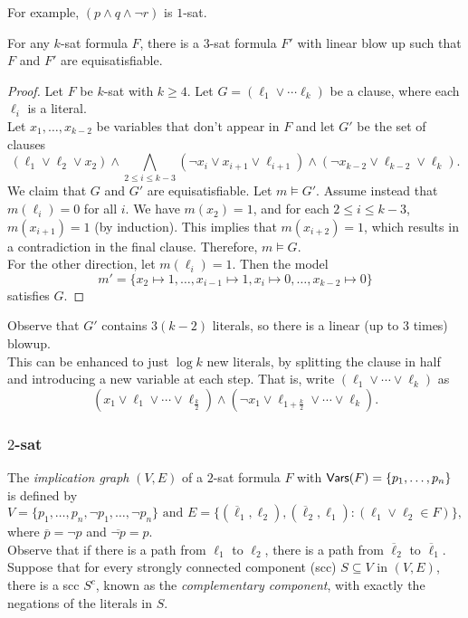 For example, $(p\wedge q\wedge \neg r)$ is $1$-sat.

\begin{theorem}
	For any $k$-sat formula $F$, there is a $3$-sat formula $F'$ with linear blow up such that $F$ and $F'$ are equisatisfiable.
\end{theorem}
\begin{proof}
	Let $F$ be $k$-sat with $k\geq 4$. Let $G=(\ell_1\lor\cdots\ell_k)$ be a clause, where each $\ell_i$ is a literal.\\
	Let $x_1,\ldots,x_{k-2}$ be variables that don't appear in $F$ and let $G'$ be the set of clauses
	\[ (\ell_1\lor\ell_2\lor x_2) \land \bigwedge_{2\leq i\leq k-3} (\neg x_i \lor x_{i+1} \lor \ell_{i+1}) \land (\neg x_{k-2} \lor \ell_{k-2} \lor \ell_k). \]
	We claim that $G$ and $G'$ are equisatisfiable. Let $m\vDash G'$. Assume instead that $m(\ell_i)=0$ for all $i$. We have $m(x_2) = 1$, and for each $2\leq i\leq k-3$, $m(x_{i+1}) = 1$ (by induction). This implies that $m(x_{i+2}) = 1$, which results in a contradiction in the final clause. Therefore, $m\vDash G$.\\
	For the other direction, let $m(\ell_i)=1$. Then the model
	\[ m' = \{x_2\mapsto 1, \ldots,x_{i-1}\mapsto 1,x_i\mapsto 0,\ldots,x_{k-2}\mapsto 0\} \]
	satisfies $G$.
\end{proof}

Observe that $G'$ contains $3(k-2)$ literals, so there is a linear (up to $3$ times) blowup.\\
This can be enhanced to just $\log k$ new literals, by splitting the clause in half and introducing a new variable at each step. That is, write $(\ell_1\lor\cdots\lor\ell_k)$ as
\[ (x_1\lor\ell_1\lor\cdots\lor\ell_{\frac{k}{2}})\land(\neg x_1\lor\ell_{1+\frac{k}{2}}\lor\cdots\lor\ell_{k}). \]

\subsubsection{\texorpdfstring{$2$}{2}-sat}

The \textit{implication graph} $(V,E)$ of a $2$-sat formula $F$ with $\mathsf{Vars}(F)=\{p_1,\ldots,p_n\}$ is defined by
\[ V = \{p_1,\ldots,p_n,\neg p_1,\ldots,\neg p_n\}\text{ and }E=\{(\overline{\ell}_1,\ell_2),(\overline{\ell}_2,\ell_1) : (\ell_1\lor\ell_2\in F)\}, \]
where $\overline{p} = \neg p$ and $\overline{\neg p} = p$.\\

Observe that if there is a path from $\ell_1$ to $\ell_2$, there is a path from $\overline{\ell}_2$ to $\overline{\ell}_1$.\\
Suppose that for every strongly connected component (scc) $S\subseteq V$ in $(V,E)$, there is a scc $S^c$, known as the \textit{complementary component}, with exactly the negations of the literals in $S$.

